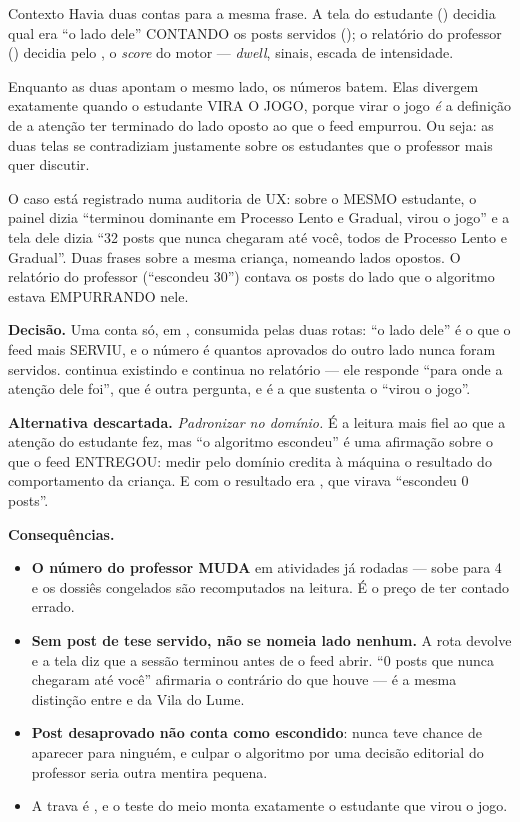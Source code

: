 \begin{especificacao}{Contexto}
Havia duas contas para a mesma frase. A tela do estudante ()
decidia qual era ``o lado dele'' CONTANDO os posts servidos
(); o relatório do professor
() decidia pelo , o \emph{score} do
motor --- \emph{dwell}, sinais, escada de intensidade.

Enquanto as duas apontam o mesmo lado, os números batem. Elas divergem
exatamente quando o estudante VIRA O JOGO, porque virar o jogo \emph{é} a definição
de a atenção ter terminado do lado oposto ao que o feed empurrou. Ou seja: as
duas telas se contradiziam justamente sobre os estudantes que o professor mais quer
discutir.

O caso está registrado numa auditoria de UX: sobre o MESMO estudante, o painel dizia
``terminou dominante em Processo Lento e Gradual, virou o jogo'' e a tela dele
dizia ``32 posts que nunca chegaram até você, todos de Processo Lento e
Gradual''. Duas frases sobre a mesma criança, nomeando lados opostos. O
relatório do professor (``escondeu 30'') contava os posts do lado que o
algoritmo estava EMPURRANDO nele.
\end{especificacao}

\textbf{Decisão.} Uma conta só, em ,
consumida pelas duas rotas: ``o lado dele'' é o que o feed mais SERVIU, e o
número é quantos aprovados do outro lado nunca foram servidos.
 continua existindo e continua no relatório --- ele responde
``para onde a atenção dele foi'', que é outra pergunta, e é a que sustenta o
``virou o jogo''.

\textbf{Alternativa descartada.} \emph{Padronizar no domínio.} É a leitura mais
fiel ao que a atenção do estudante fez, mas ``o algoritmo escondeu'' é uma
afirmação sobre o que o feed ENTREGOU: medir pelo domínio credita à máquina o
resultado do comportamento da criança. E com  o
resultado era , que virava ``escondeu 0 posts''.

\textbf{Consequências.}
\begin{itemize}
  \item \textbf{O número do professor MUDA} em atividades já rodadas ---
     sobe para 4 e os dossiês congelados são
    recomputados na leitura. É o preço de ter contado errado.
  \item \textbf{Sem post de tese servido, não se nomeia lado nenhum.} A rota
    devolve  e a tela diz que a sessão terminou antes de o
    feed abrir. ``0 posts que nunca chegaram até você'' afirmaria o contrário do
    que houve --- é a mesma distinção entre  e  da Vila do
    Lume.
  \item \textbf{Post desaprovado não conta como escondido}: nunca teve chance de
    aparecer para ninguém, e culpar o algoritmo por uma decisão editorial do
    professor seria outra mentira pequena.
  \item A trava é , e o teste
    do meio monta exatamente o estudante que virou o jogo.
\end{itemize}


